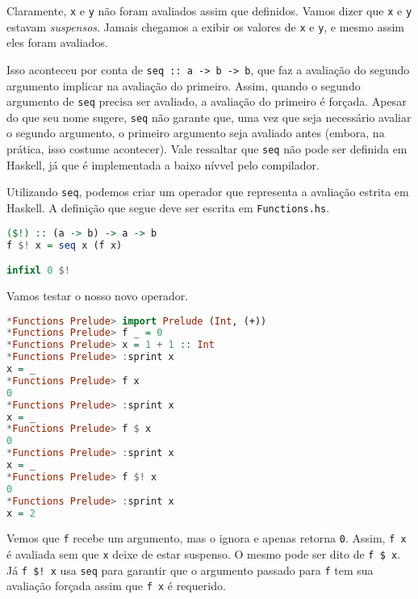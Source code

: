 \documentclass[a4paper]{article}
\begin{document}
Claramente, \texttt{x} e \texttt{y} não foram avaliados assim que definidos.
Vamos dizer que \texttt{x} e \texttt{y} estavam \emph{suspensos}.
Jamais chegamos a exibir os valores de \texttt{x} e \texttt{y}, e mesmo assim eles foram avaliados.

Isso aconteceu por conta de \texttt{seq :: a -> b -> b}, que faz a avaliação do segundo argumento implicar na avaliação do primeiro.
Assim, quando o segundo argumento de \texttt{seq} precisa ser avaliado, a avaliação do primeiro é forçada.
Apesar do que seu nome sugere, \texttt{seq} não garante que, uma vez que seja necessário avaliar o segundo argumento, o primeiro argumento seja avaliado antes (embora, na prática, isso costume acontecer).
Vale ressaltar que \texttt{seq} não pode ser definida em Haskell, já que é implementada a baixo nívvel pelo compilador.

Utilizando \texttt{seq}, podemos criar um operador que representa a avaliação estrita em Haskell.
A definição que segue deve ser escrita em \texttt{Functions.hs}.

\begin{lstlisting}[language=haskell, frame=single]
($!) :: (a -> b) -> a -> b
f $! x = seq x (f x)

infixl 0 $!
\end{lstlisting}

Vamos testar o nosso novo operador.

\begin{lstlisting}[language=haskell, frame=single]
*Functions Prelude> import Prelude (Int, (+))
*Functions Prelude> f _ = 0
*Functions Prelude> x = 1 + 1 :: Int
*Functions Prelude> :sprint x
x = _
*Functions Prelude> f x
0
*Functions Prelude> :sprint x
x = _
*Functions Prelude> f $ x
0
*Functions Prelude> :sprint x
x = _
*Functions Prelude> f $! x
0
*Functions Prelude> :sprint x
x = 2
\end{lstlisting}

Vemos que \texttt{f} recebe um argumento, mas o ignora e apenas retorna \texttt{0}.
Assim, \texttt{f x} é avaliada sem que \texttt{x} deixe de estar suspenso.
O mesmo pode ser dito de \texttt{f \$ x}.
Já \texttt{f \$! x} usa \texttt{seq} para garantir que o argumento passado para \texttt{f} tem sua avaliação forçada assim que \texttt{f x} é requerido.
\end{document}
